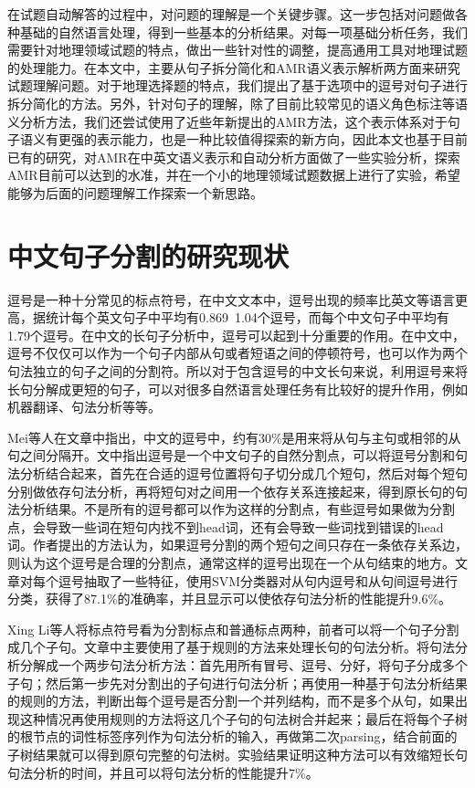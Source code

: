 \documentclass[master, winfont]{njuthesis}
\begin{document}
在试题自动解答的过程中，对问题的理解是一个关键步骤。这一步包括对问题做各种基础的自然语言处理，得到一些基本的分析结果。对每一项基础分析任务，我们需要针对地理领域试题的特点，做出一些针对性的调整，提高通用工具对地理试题的处理能力。在本文中，主要从句子拆分简化和AMR语义表示解析两方面来研究试题理解问题。对于地理选择题的特点，我们提出了基于选项中的逗号对句子进行拆分简化的方法。另外，针对句子的理解，除了目前比较常见的语义角色标注等语义分析方法，我们还尝试使用了近些年新提出的AMR方法，这个表示体系对于句子语义有更强的表示能力，也是一种比较值得探索的新方向，因此本文也基于目前已有的研究，对AMR在中英文语义表示和自动分析方面做了一些实验分析，探索AMR目前可以达到的水准，并在一个小的地理领域试题数据上进行了实验，希望能够为后面的问题理解工作探索一个新思路。

\section{中文句子分割的研究现状}
\label{section:imtnow}
逗号是一种十分常见的标点符号，在中文文本中，逗号出现的频率比英文等语言更高，据统计每个英文句子中平均有0.869~1.04个逗号，而每个中文句子中平均有1.79个逗号\cite{Jin2004}。在中文的长句子分析中，逗号可以起到十分重要的作用。在中文中，逗号不仅仅可以作为一个句子内部从句或者短语之间的停顿符号\cite{Li2004}，也可以作为两个句法独立的句子之间的分割符\cite{Xu2013}\cite{Xue2011}。所以对于包含逗号的中文长句来说，利用逗号来将长句分解成更短的句子，可以对很多自然语言处理任务有比较好的提升作用，例如机器翻译\cite{Wang2014}、句法分析\cite{Jin2004}\cite{2007}\cite{Kong2014}\cite{Li2004}\cite{Li2008}等等。

Mei等人\cite{Jin2004}在文章中指出，中文的逗号中，约有30\%是用来将从句与主句或相邻的从句之间分隔开。文中指出逗号是一个中文句子的自然分割点，可以将逗号分割和句法分析结合起来，首先在合适的逗号位置将句子切分成几个短句，然后对每个短句分别做依存句法分析，再将短句对之间用一个依存关系连接起来，得到原长句的句法分析结果。不是所有的逗号都可以作为这样的分割点，有些逗号如果做为分割点，会导致一些词在短句内找不到head词，还有会导致一些词找到错误的head词。作者提出的方法认为，如果逗号分割的两个短句之间只存在一条依存关系边，则认为这个逗号是合理的分割点，通常这样的逗号出现在一个从句结束的地方。文章对每个逗号抽取了一些特征，使用SVM分类器对从句内逗号和从句间逗号进行分类，获得了87.1\%的准确率，并且显示可以使依存句法分析的性能提升9.6\%。

Xing Li等人\cite{Li2004}将标点符号看为分割标点和普通标点两种，前者可以将一个句子分割成几个子句。文章中主要使用了基于规则的方法来处理长句的句法分析。将句法分析分解成一个两步句法分析方法：首先用所有冒号、逗号、分好，将句子分成多个子句；然后第一步先对分割出的子句进行句法分析；再使用一种基于句法分析结果的规则的方法，判断出每个逗号是否分割一个并列结构，而不是多个从句，如果出现这种情况再使用规则的方法将这几个子句的句法树合并起来；最后在将每个子树的根节点的词性标签序列作为句法分析的输入，再做第二次parsing，结合前面的子树结果就可以得到原句完整的句法树。实验结果证明这种方法可以有效缩短长句句法分析的时间，并且可以将句法分析的性能提升7\%。
\end{document}

